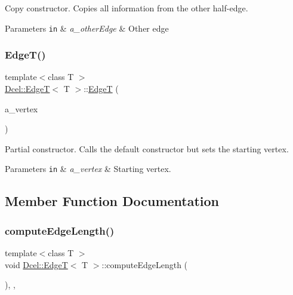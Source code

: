 Copy constructor. Copies all information from the other half-\/edge. 


\begin{DoxyParams}[1]{Parameters}
\mbox{\tt in}  & {\em a\+\_\+other\+Edge} & Other edge \\
\hline
\end{DoxyParams}
\mbox{\label{classDcel_1_1EdgeT_a639b427e60ede1948f8344a41b9bfc32}} 
\subsubsection{\texorpdfstring{Edge\+T()}{EdgeT()}\hspace{0.1cm}{\footnotesize\ttfamily [2/2]}}
{\footnotesize\ttfamily template$<$class T $>$ \\
\hyperlink{classDcel_1_1EdgeT}{Dcel\+::\+EdgeT}$<$ T $>$\+::\hyperlink{classDcel_1_1EdgeT}{EdgeT} (\begin{DoxyParamCaption}\item[{const \hyperlink{classDcel_1_1EdgeT_ab4ba57cfc6b2f90da43096eea87bb284}{Vertex\+Ptr} \&}]{a\+\_\+vertex }\end{DoxyParamCaption})\hspace{0.3cm}{\ttfamily [inline]}}



Partial constructor. Calls the default constructor but sets the starting vertex. 


\begin{DoxyParams}[1]{Parameters}
\mbox{\tt in}  & {\em a\+\_\+vertex} & Starting vertex. \\
\hline
\end{DoxyParams}


\subsection{Member Function Documentation}
\mbox{\label{classDcel_1_1EdgeT_abddfe200f9af04cf49362d4ed1e8d37b}} 
\subsubsection{\texorpdfstring{compute\+Edge\+Length()}{computeEdgeLength()}}
{\footnotesize\ttfamily template$<$class T $>$ \\
void \hyperlink{classDcel_1_1EdgeT}{Dcel\+::\+EdgeT}$<$ T $>$\+::compute\+Edge\+Length (\begin{DoxyParamCaption}{ }\end{DoxyParamCaption})\hspace{0.3cm}{\ttfamily [inline]}, {\ttfamily [protected]}, {\ttfamily [noexcept]}}



